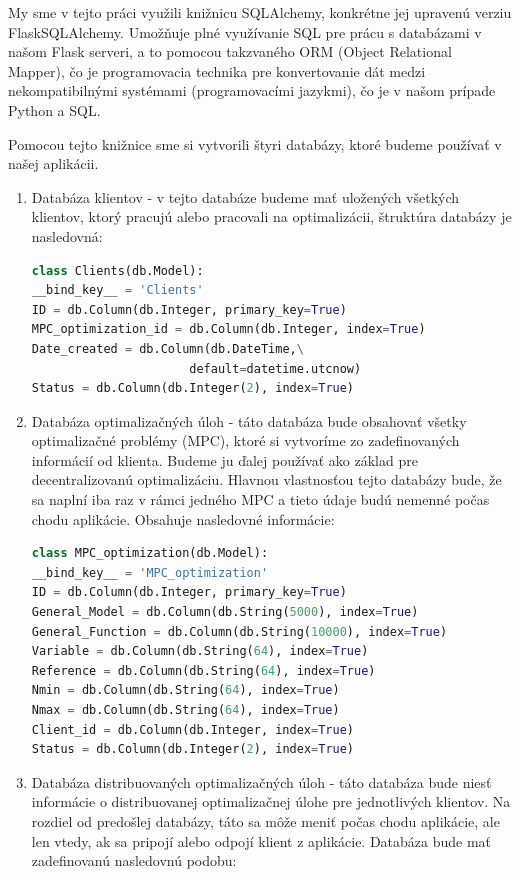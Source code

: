My sme v tejto práci využili knižnicu SQLAlchemy, konkrétne jej upravenú verziu FlaskSQLAlchemy. Umožňuje plné využívanie SQL pre prácu s databázami v našom Flask serveri, a to pomocou takzvaného ORM (Object Relational Mapper), čo je programovacia technika pre konvertovanie dát medzi nekompatibilnými systémami (programovacími jazykmi), čo je v našom prípade Python a SQL. 

Pomocou tejto knižnice sme si vytvorili štyri databázy, ktoré budeme používať v našej aplikácii. 
\label{DB:Klient}
\begin{enumerate}
\item{ Databáza klientov - v tejto databáze budeme mať uložených všetkých klientov, ktorý pracujú alebo pracovali na optimalizácii, štruktúra databázy je nasledovná:
\begin{lstlisting}[language=Python]
class Clients(db.Model):
__bind_key__ = 'Clients'
ID = db.Column(db.Integer, primary_key=True)
MPC_optimization_id = db.Column(db.Integer, index=True)
Date_created = db.Column(db.DateTime,\
                      default=datetime.utcnow)
Status = db.Column(db.Integer(2), index=True) 
\end{lstlisting}
}
\label{DB:OPT}
\item{ Databáza optimalizačných úloh - táto databáza bude obsahovať všetky optimalizačné problémy (MPC), ktoré si vytvoríme zo zadefinovaných informácií od klienta. Budeme ju ďalej používať ako základ pre decentralizovanú optimalizáciu. Hlavnou vlastnosťou tejto databázy bude, že sa naplní iba raz v rámci jedného MPC a tieto údaje budú nemenné počas chodu aplikácie. Obsahuje nasledovné informácie:
\begin{lstlisting}[language=Python]
class MPC_optimization(db.Model):
__bind_key__ = 'MPC_optimization'
ID = db.Column(db.Integer, primary_key=True)
General_Model = db.Column(db.String(5000), index=True)
General_Function = db.Column(db.String(10000), index=True)
Variable = db.Column(db.String(64), index=True)
Reference = db.Column(db.String(64), index=True)
Nmin = db.Column(db.String(64), index=True)
Nmax = db.Column(db.String(64), index=True)
Client_id = db.Column(db.Integer, index=True)
Status = db.Column(db.Integer(2), index=True)
\end{lstlisting}
}
\label{DB:WORKER}
\item{ Databáza distribuovaných optimalizačných úloh - táto databáza bude niesť informácie o distribuovanej optimalizačnej úlohe pre jednotlivých klientov. Na rozdiel od predošlej databázy, táto sa môže meniť počas chodu aplikácie, ale len vtedy, ak sa pripojí alebo odpojí klient z aplikácie. Databáza bude mať zadefinovanú nasledovnú podobu:
}
\end{enumerate}
